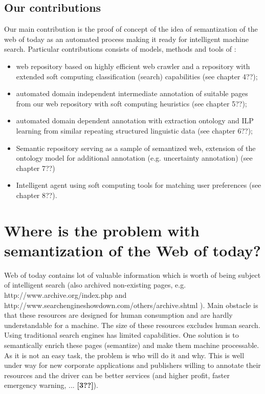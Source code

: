 \documentclass{sig-alternate}
\begin{document}
\subsection{Our contributions}

 Our main contribution is the proof of concept of the idea of semantization of the web of today as an automated process making it ready for intelligent machine search. Particular contributions consists of models, methods and tools of :

\begin{itemize}
\item web repository based on highly efficient web crawler and a repository with extended soft computing classification (search) capabilities (see chapter 4??); 
\item automated domain independent intermediate annotation of suitable pages from our web repository with soft computing heuristics (see chapter 5??);
\item automated domain dependent annotation with extraction ontology and ILP learning from similar repeating structured linguistic data (see chapter 6??); 
\item Semantic repository serving as a sample of semantized web, extension of the ontology model for additional annotation (e.g. uncertainty annotation) (see chapter 7??)
\item Intelligent agent using soft computing tools for matching user preferences (see chapter 8??).
\end{itemize}




\section{Where is the problem with semantization of the Web of today?}

Web of today contains lot of valuable information which is worth of being subject of intelligent search (also archived non-existing pages, e.g. http://www.archive.org/index.php and http://www.searchengineshowdown.com/others/archive.shtml ). Main obstacle is that these resources are designed for human consumption and are hardly understandable for a machine. The size of these resources excludes human search. Using traditional search engines has limited capabilities. One solution is to semantically enrich these pages (semantize) and make them machine processable.  As it is not an easy task, the problem is who will do it and why. This is well under way for new corporate applications and publishers willing to annotate their resources and the driver can be better services (and higher profit, faster emergency warning, ... \textbf{[3??]}).
\end{document}

